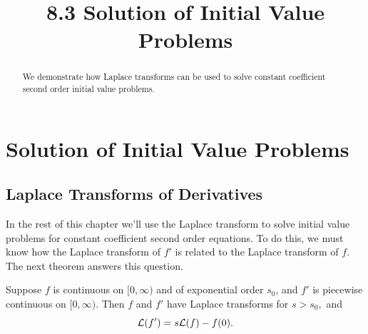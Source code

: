 \documentclass{ximera}
\title{8.3 Solution of Initial Value Problems}%
\begin{document}
\begin{abstract}
We demonstrate how Laplace transforms can be used to solve constant coefficient second order initial value problems.
\end{abstract}

\maketitle

\section*{Solution of Initial Value Problems}

\subsection*{Laplace Transforms of Derivatives}

In the rest of this chapter we'll use the Laplace transform to solve
initial value problems for constant coefficient second order
equations. To do this, we must know how the Laplace transform of
 $f'$ is related to the Laplace transform of $f$. The
next theorem answers this question.

\begin{theorem}\label{thmtype:8.3.1}
 Suppose $f$ is continuous
on $[0,\infty)$ and of exponential order $s_0$, and $f'$ is piecewise
continuous on $[0,\infty).$  Then $f$ and $f'$ have Laplace transforms for
$s > s_0,$ and
\begin{equation}\label{eq:8.3.1}
{\cal L}(f')=s {\cal L}(f)-f(0).
\end{equation}
\end{theorem}
\end{document}

